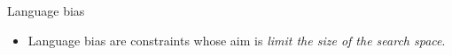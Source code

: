 \documentclass{beamer}
\begin{document}
\begin{frame}{Language bias}
    \begin{itemize}
        \item Language bias are constraints whose aim is \textit{limit the size of the search space}.
    \end{itemize}
\end{frame}

\end{document}
